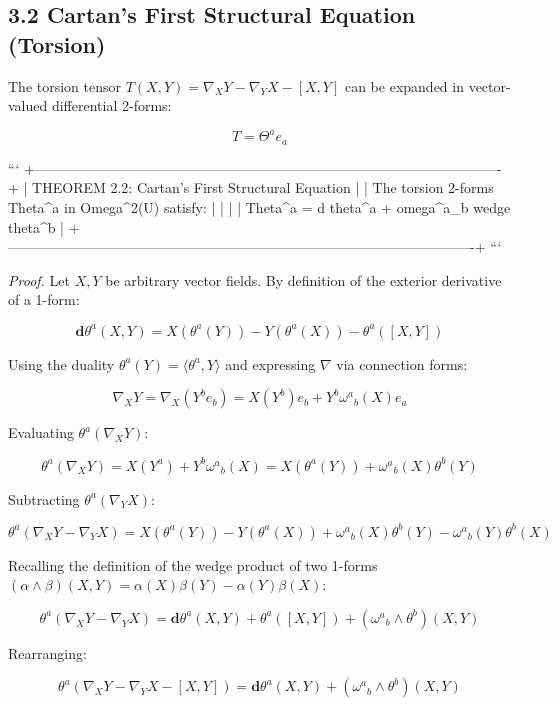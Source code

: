 \documentclass[11pt,twoside,openright]{amsbook}
\begin{document}
{{{{{{\subsection{3.2 Cartan's First Structural Equation (Torsion)}

The torsion tensor $T(X, Y) = \nabla_X Y - \nabla_Y X - [X, Y]$ can be expanded in vector-valued differential 2-forms:

$$T = \Theta^a e_a$$

```
+----------------------------------------------------------------------------------------------------+
| THEOREM 2.2: Cartan's First Structural Equation                                                    |
| The torsion 2-forms Theta^a in Omega^2(U) satisfy:                                                 |
|                                                                                                    |
|   Theta^a = d theta^a + omega^a{}_b wedge theta^b                                                  |
+----------------------------------------------------------------------------------------------------+
```

\textit{Proof.} Let $X, Y$ be arbitrary vector fields. By definition of the exterior derivative of a 1-form:

$$\mathbf{d}\theta^a(X, Y) = X(\theta^a(Y)) - Y(\theta^a(X)) - \theta^a([X, Y])$$

Using the duality $\theta^a(Y) = \langle \theta^a, Y \rangle$ and expressing $\nabla$ via connection forms:

$$\nabla_X Y = \nabla_X (Y^b e_b) = X(Y^b) e_b + Y^b \omega^a{}_b(X) e_a$$

Evaluating $\theta^a(\nabla_X Y)$:

$$\theta^a(\nabla_X Y) = X(Y^a) + Y^b \omega^a{}_b(X) = X(\theta^a(Y)) + \omega^a{}_b(X) \theta^b(Y)$$

Subtracting $\theta^a(\nabla_Y X)$:

$$\theta^a(\nabla_X Y - \nabla_Y X) = X(\theta^a(Y)) - Y(\theta^a(X)) + \omega^a{}_b(X) \theta^b(Y) - \omega^a{}_b(Y) \theta^b(X)$$

Recalling the definition of the wedge product of two 1-forms $(\alpha \wedge \beta)(X, Y) = \alpha(X)\beta(Y) - \alpha(Y)\beta(X)$:

$$\theta^a(\nabla_X Y - \nabla_Y X) = \mathbf{d}\theta^a(X, Y) + \theta^a([X, Y]) + (\omega^a{}_b \wedge \theta^b)(X, Y)$$

Rearranging:

$$\theta^a(\nabla_X Y - \nabla_Y X - [X, Y]) = \mathbf{d}\theta^a(X, Y) + (\omega^a{}_b \wedge \theta^b)(X, Y)$$

}}}}}}
\end{document}
